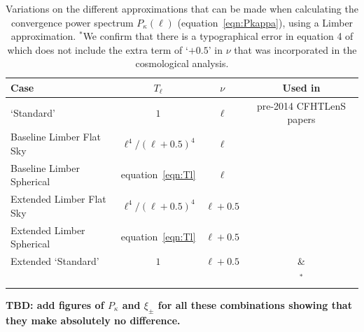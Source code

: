  \begin{table}[htb]
\label{tab:Tl_nu}
\begin{center}
\begin{tabular}{ | l | c | c  | c |}
\hline
Case & $T_\ell$ & $\nu$ & Used in \\ \hline
\citet{kitching/etal:2016} `Standard' & $1$ & $\ell$ & pre-2014 CFHTLenS papers \\
Baseline Limber Flat Sky &  $\ell^4 / (\ell + 0.5)^4$ & $\ell$ & \\
Baseline Limber Spherical & equation~\ref{eqn:Tl} & $\ell$ & \\
Extended Limber Flat Sky & $\ell^4 / (\ell + 0.5)^4$ & $\ell + 0.5$ & \\
Extended Limber Spherical & equation~\ref{eqn:Tl}& $\ell + 0.5$  & \\
Extended `Standard' & $1$ & $\ell + 0.5$ & \citet{joudaki/etal:2016} \&  \\
  & & & \citet{hildebrandt/etal:2016}$^*$\\\hline
 \end{tabular}
 \end{center}
 \caption{Variations on the different approximations that can be made when calculating the convergence power spectrum $P_\kappa(\ell)$ (equation~\ref{eqn:Pkappa}), using a Limber approximation.  $^*$We confirm that there is a typographical error in equation 4 of \citet{hildebrandt/etal:2016} which does not include the extra term of `$+0.5$' in $\nu$ that was incorporated in the cosmological analysis.}  
 \end{table}


{\bf TBD: add figures of $P_\kappa$ and $\xi_\pm$ for all these combinations showing that they make absolutely no difference.}
 
